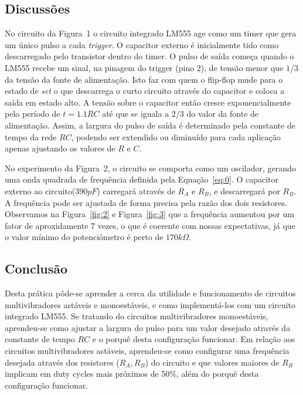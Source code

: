 \documentclass[12pt,a4paper]{article}
\begin{document}
\subsection{Discussões}
No circuito da Figura~1 o circuito integrado LM555 age como um timer que gera um único pulso a cada \emph{trigger}. O capacitor externo é inicialmente tido 
como descarregado pelo transistor dentro do timer.
O pulso de saída começa quando o LM555 recebe um sinal, na pinagem do trigger (pino 2), 
de tensão menor que $1/3$ da tensão da fonte de alimentação. Isto faz com quem o flip-flop mude para o estado de \emph{set} o que descarrega o curto circuito através do capacitor 
e coloca a saída em estado alto.
A tensão sobre o capacitor então cresce exponencialmente pelo período de $t= 1.1 RC$ até que se iguala a $2/3$ do valor da fonte de alimentação. 
Assim, a largura do pulso de saída é determinado pela constante de tempo da rede $RC$, podendo ser extendido ou diminuído para cada aplicação apenas ajustando os valores de $R$ e $C$. 

No experimento da Figura~2, o circuito se comporta como um oscilador, gerando uma onda quadrada de frequência definida pela Equação~\ref{eq:0}. O capacitor externo ao circuito($390pF$) carregará através de $R_A$ e $R_B$, e descarregará por $R_B$. 
A frequência pode ser ajustada de forma precisa pela razão dos dois resistores. Observamos na Figura~\ref{fig:2} e Figura~\ref{fig:3} que a frequência aumentou por um fator
de aproxidamente 7 vezes, o que é coerente com nossas expectativas, já que o valor mínimo do potenciômetro é perto de $170 k\Omega$.
\newpage
\subsection{Conclusão}
Desta prática pôde-se aprender a cerca da utilidade e funcionamento de circuitos multivibradores astáveis e monoestáveis, e como implementá-los com um circuito integrado LM555.  Se tratando do circuitos multivibradores monoestáveis, aprendeu-se como ajustar a largura do pulso
para um valor desejado através da constante de tempo $RC$ e o porquê desta configuração funcionar. Em relação aos circuitos multivibradores astáveis, aprendeu-se como configurar uma frequência desejada através dos resistores ($R_A, R_B$) do circuito e que valores maiores de $R_B$ implicam em duty cycles mais próximos de 50\%, além do porquê desta configuração funcionar.
\end{document}
